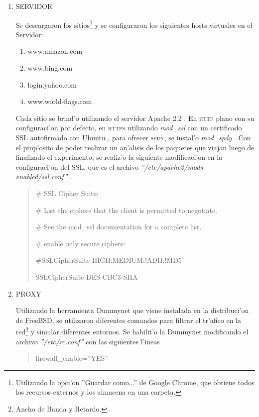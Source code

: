 \documentclass[a4paper,11pt,twocolumn]{article}
\begin{document}
\begin{enumerate}
\item SERVIDOR

Se descargaron los sitios\footnote{Utilizando la opci'on ''Guardar como...'' de Google Chrome, que obtiene todos los recursos externos y los almacena en una carpeta.} y se configuraron los siguientes hosts virtuales en el Servidor:
\begin{enumerate}
\item www.amazon.com
\item www.bing.com
\item login.yahoo.com
\item www.world-flags.com \cite{flags}
\end{enumerate}

Cada sitio se brind'o utilizando el servidor Apache 2.2 \cite{apache}. En \textsc{http} plano con su configuraci'on por defecto, en \textsc{https} utilizando \emph{mod\_ssl} \cite{modSSL} con un certificado SSL autofirmado con Ubuntu \cite[Secci'on 4]{spdyGT}, para ofrecer \textsc{spdy}, se instal'o \emph{mod\_spdy} \cite{modSPDY}. Con el prop'osito de poder realizar un an'alisis de los paquetes que viajan luego de finalizado el experimento, se realiz'o la siguiente modificaci'on en la configuraci'on del SSL, que es el archivo \emph{''/etc/apache2/mods-enabled/ssl.conf''} \cite{siffSSL}.

\begin{quote}\small
\#   SSL Cipher Suite:

\#   List the ciphers that the client is permitted to negotiate.

\#   See the mod\_ssl documentation for a complete list.

\#   enable only secure ciphers:

\sout{\#SSLCipherSuite HIGH:MEDIUM:!ADH:!MD5}

SSLCipherSuite DES-CBC3-SHA
\end{quote}

\item PROXY

Utilizando la herramienta Dummynet \cite{dummynet} que viene instalada en la distribuci'on de FreeBSD, se utilizaron diferentes comandos \cite{ipfw} para filtrar el tr'afico en la red\footnote{Ancho de Banda y Retardo.} y simular diferentes entornos. Se habilit'o la Dummynet modificando el archivo \emph{''/etc/rc.conf''} con las siguientes l'ineas

\begin{quote}\small
firewall\_enable=''YES''


\end{quote}
\end{enumerate}
\end{document}
